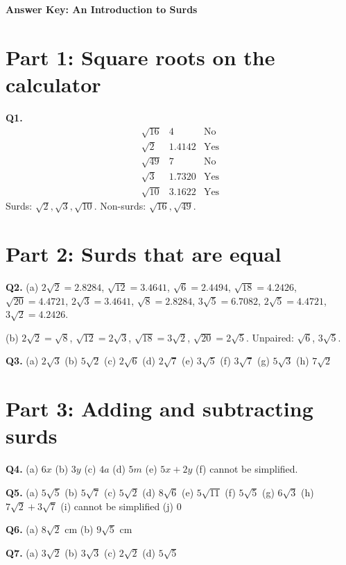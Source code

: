\documentclass[12pt,a4paper]{article}
\begin{document}
\begin{center}
{\Large\bfseries Answer Key: An Introduction to Surds}
\end{center}

\section*{Part 1: Square roots on the calculator}

\textbf{Q1.}
\[
\begin{array}{c|c|c}
\sqrt{16} & 4 & \text{No}\\
\sqrt{2} & 1.4142 & \text{Yes}\\
\sqrt{49} & 7 & \text{No}\\
\sqrt{3} & 1.7320 & \text{Yes}\\
\sqrt{10} & 3.1622 & \text{Yes}
\end{array}
\]
Surds: \(\sqrt2,\sqrt3,\sqrt{10}\). Non-surds: \(\sqrt{16},\sqrt{49}\).

\section*{Part 2: Surds that are equal}

\textbf{Q2.} (a) \(2\sqrt2=2.8284\), \(\sqrt{12}=3.4641\), \(\sqrt6=2.4494\), \(\sqrt{18}=4.2426\), \(\sqrt{20}=4.4721\), \(2\sqrt3=3.4641\), \(\sqrt8=2.8284\), \(3\sqrt5=6.7082\), \(2\sqrt5=4.4721\), \(3\sqrt2=4.2426\).

(b) \(2\sqrt2=\sqrt8\), \(\sqrt{12}=2\sqrt3\), \(\sqrt{18}=3\sqrt2\), \(\sqrt{20}=2\sqrt5\). Unpaired: \(\sqrt6\), \(3\sqrt5\).

\textbf{Q3.}
(a) \(2\sqrt3\)
(b) \(5\sqrt2\)
(c) \(2\sqrt6\)
(d) \(2\sqrt7\)
(e) \(3\sqrt5\)
(f) \(3\sqrt7\)
(g) \(5\sqrt3\)
(h) \(7\sqrt2\)

\section*{Part 3: Adding and subtracting surds}

\textbf{Q4.}
(a) \(6x\)
(b) \(3y\)
(c) \(4a\)
(d) \(5m\)
(e) \(5x+2y\)
(f) cannot be simplified.

\textbf{Q5.}
(a) \(5\sqrt5\)
(b) \(5\sqrt7\)
(c) \(5\sqrt2\)
(d) \(8\sqrt6\)
(e) \(5\sqrt{11}\)
(f) \(5\sqrt5\)
(g) \(6\sqrt3\)
(h) \(7\sqrt2+3\sqrt7\)
(i) cannot be simplified
(j) \(0\)

\textbf{Q6.}
(a) \(8\sqrt2\) cm
(b) \(9\sqrt5\) cm

\textbf{Q7.}
(a) \(3\sqrt2\)
(b) \(3\sqrt3\)
(c) \(2\sqrt2\)
(d) \(5\sqrt5\)
\end{document}
